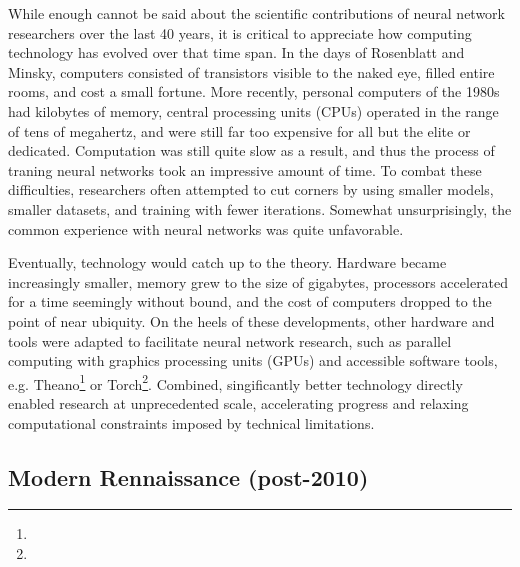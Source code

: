 While enough cannot be said about the scientific contributions of neural network researchers over the last 40 years, it is critical to appreciate how computing technology has evolved over that time span.
In the days of Rosenblatt and Minsky, computers consisted of transistors visible to the naked eye, filled entire rooms, and cost a small fortune.
More recently, personal computers of the 1980s had kilobytes of memory, central processing units (CPUs) operated in the range of tens of megahertz, and were still far too expensive for all but the elite or dedicated.
Computation was still quite slow as a result, and thus the process of traning neural networks took an impressive amount of time.
To combat these difficulties, researchers often attempted to cut corners by using smaller models, smaller datasets, and training with fewer iterations.
Somewhat unsurprisingly, the common experience with neural networks was quite unfavorable.

Eventually, technology would catch up to the theory.
Hardware became increasingly smaller, memory grew to the size of gigabytes, processors accelerated for a time seemingly without bound, and the cost of computers dropped to the point of near ubiquity.
On the heels of these developments, other hardware and tools were adapted to facilitate neural network research, such as parallel computing with graphics processing units (GPUs) and accessible software tools, e.g. Theano\footnote{} or Torch\footnote{}.
Combined, singificantly better technology directly enabled research at unprecedented scale, accelerating progress and relaxing computational constraints imposed by technical limitations.



\subsection{Modern Rennaissance (post-2010)}
\label{subsec:rennaissance}

